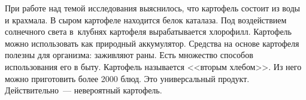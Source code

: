  При работе над темой исследования выяснилось, что картофель состоит из воды и крахмала. В сыром картофеле находится белок каталаза. Под воздействием солнечного света в~клубнях картофеля вырабатывается хлорофилл. Картофель можно использовать как природный  аккумулятор. Средства на основе картофеля полезны для организма: заживляют раны. Есть множество способов использования его в быту. Картофель называется <<вторым хлебом>>. Из него можно приготовить более 2000 блюд. Это универсальный продукт. Действительно~--- невероятный картофель.
